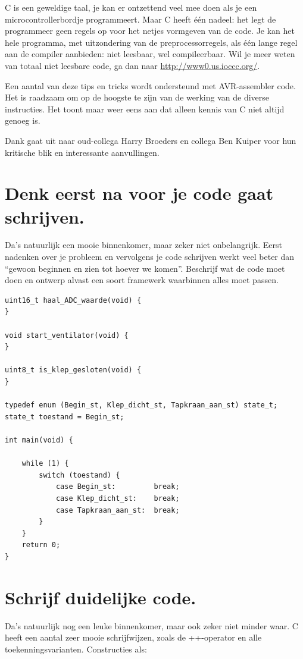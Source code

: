 \documentclass[12pt,a4paper,final,twoside,fleqn]{article}
\begin{document}
C is een geweldige taal, je kan er ontzettend veel mee doen als je een
microcontrollerbordje programmeert. Maar C heeft \'{e}\'{e}n nadeel: het
legt de programmeer geen regels op voor het netjes vormgeven van de code.
Je kan het hele programma, met uitzondering van de preprocessorregels, als
\'{e}\'{e}n lange regel aan de compiler aanbieden: niet leesbaar, wel
compileerbaar. Wil je meer weten van totaal niet leesbare code, ga dan naar
\url{http://www0.us.ioccc.org/}.

Een aantal van deze tips en tricks wordt ondersteund met AVR-assembler code.
Het is raadzaam om op de hoogste te zijn van de werking van de diverse instructies.
Het toont maar weer eens aan dat alleen kennis van C niet altijd genoeg is.

Dank gaat uit naar oud-collega Harry Broeders en collega Ben Kuiper voor hun kritische
blik en interessante aanvullingen.


\newpage
\section{Denk eerst na voor je code gaat schrijven.}

Da's natuurlijk een mooie binnenkomer, maar zeker niet onbelangrijk. Eerst
nadenken over je probleem en vervolgens je code schrijven werkt veel beter
dan ``gewoon beginnen en zien tot hoever we komen''. Beschrijf wat de code
moet doen en ontwerp alvast een soort framewerk waarbinnen alles moet passen.

\begin{lstlisting}[style=C,caption=Voorbeeld van een framework]
uint16_t haal_ADC_waarde(void) {
}

void start_ventilator(void) {
}

uint8_t is_klep_gesloten(void) {
}

typedef enum (Begin_st, Klep_dicht_st, Tapkraan_aan_st) state_t;
state_t toestand = Begin_st;

int main(void) {

	while (1) {
		switch (toestand) {
			case Begin_st:         break;
			case Klep_dicht_st:    break;
			case Tapkraan_aan_st:  break;
		}
	}
	return 0;
}
\end{lstlisting}


\section{Schrijf duidelijke code.}

Da's natuurlijk nog een leuke binnenkomer, maar ook zeker niet minder waar.
C heeft een aantal zeer mooie schrijfwijzen, zoals de ++-operator en alle
toekenningsvarianten. Constructies als: 
\end{document}
